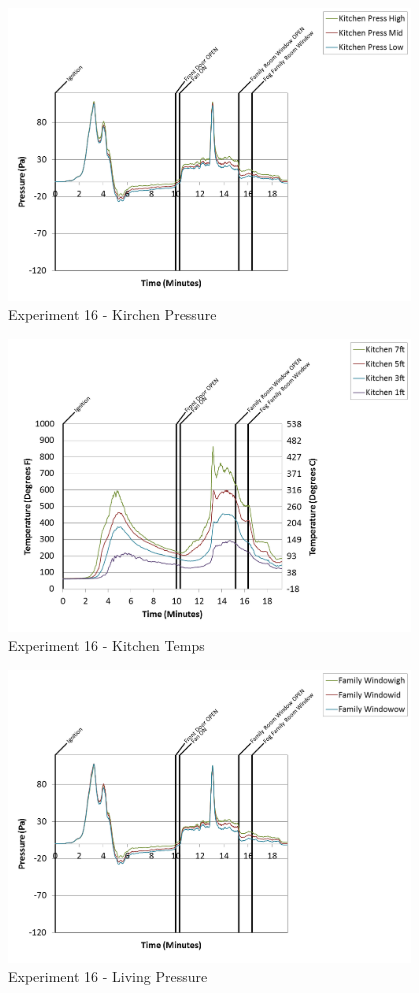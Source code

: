 \documentclass{article}
\begin{document}
\begin{appendices}
\begin{figure}[h!]
	\centering
	\includegraphics[height=3.05in]{0_Images/Results_Charts/Exp_16_Charts/KirchenPressure.png}
	\caption{Experiment 16 - Kirchen Pressure}
\end{figure}

\clearpage

\begin{figure}[h!]
	\centering
	\includegraphics[height=3.05in]{0_Images/Results_Charts/Exp_16_Charts/KitchenTemps.png}
	\caption{Experiment 16 - Kitchen Temps}
\end{figure}


\begin{figure}[h!]
	\centering
	\includegraphics[height=3.05in]{0_Images/Results_Charts/Exp_16_Charts/LivingPressure.png}
	\caption{Experiment 16 - Living Pressure}
\end{figure}


\end{appendices}
\end{document}
